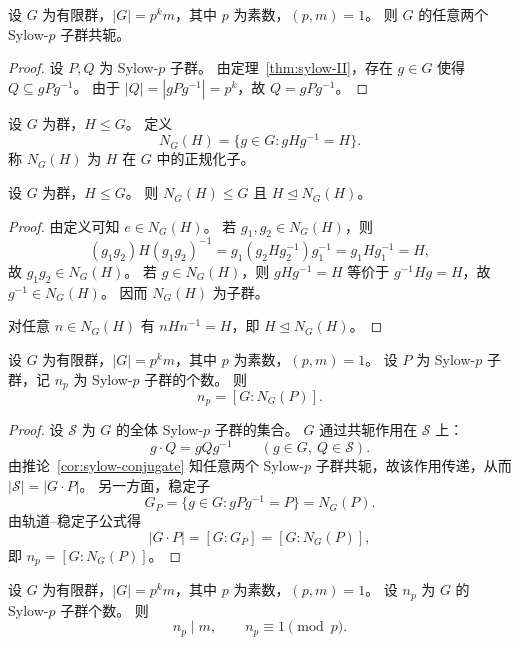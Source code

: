 \documentclass[lang=cn,a4paper,newtx]{elegantbook}
\begin{document}
\begin{corollary}\label{sylow-conjugate}
  设 $G$ 为有限群，$|G|=p^k m$，其中 $p$ 为素数，$(p,m)=1$。
  则 $G$ 的任意两个 Sylow-$p$ 子群共轭。
\end{corollary}

\begin{proof}
  设 $P,Q$ 为 Sylow-$p$ 子群。
  由定理~\ref{thm:sylow-II}，存在 $g\in G$ 使得 $Q\subseteq gPg^{-1}$。
  由于 $|Q|=|gPg^{-1}|=p^k$，故 $Q=gPg^{-1}$。
\end{proof}

\begin{definition}[正规化子]
  设 $G$ 为群，$H\le G$。
  定义
  \[
    N_G(H)=\{g\in G:gHg^{-1}=H\}.
  \]
  称 $N_G(H)$ 为 $H$ 在 $G$ 中的正规化子。
\end{definition}

\begin{proposition}
  设 $G$ 为群，$H\le G$。
  则 $N_G(H)\le G$ 且 $H\trianglelefteq N_G(H)$。
\end{proposition}

\begin{proof}
  由定义可知 $e\in N_G(H)$。
  若 $g_1,g_2\in N_G(H)$，则
  \[
    (g_1g_2)H(g_1g_2)^{-1}=g_1(g_2Hg_2^{-1})g_1^{-1}=g_1Hg_1^{-1}=H,
  \]
  故 $g_1g_2\in N_G(H)$。
  若 $g\in N_G(H)$，则 $gHg^{-1}=H$ 等价于 $g^{-1}Hg=H$，故 $g^{-1}\in N_G(H)$。
  因而 $N_G(H)$ 为子群。

  对任意 $n\in N_G(H)$ 有 $nHn^{-1}=H$，即 $H\trianglelefteq N_G(H)$。
\end{proof}

\begin{proposition}
  设 $G$ 为有限群，$|G|=p^k m$，其中 $p$ 为素数，$(p,m)=1$。
  设 $P$ 为 Sylow-$p$ 子群，记 $n_p$ 为 Sylow-$p$ 子群的个数。
  则
  \[
    n_p=[G:N_G(P)].
  \]
\end{proposition}

\begin{proof}
  设 $\mathcal{S}$ 为 $G$ 的全体 Sylow-$p$ 子群的集合。
  $G$ 通过共轭作用在 $\mathcal{S}$ 上：
  \[
    g\cdot Q=gQg^{-1}\qquad (g\in G,\ Q\in\mathcal{S}).
  \]
  由推论~\ref{cor:sylow-conjugate} 知任意两个 Sylow-$p$ 子群共轭，故该作用传递，从而 $|\mathcal{S}|=|G\cdot P|$。
  另一方面，稳定子
  \[
    G_P=\{g\in G:gPg^{-1}=P\}=N_G(P).
  \]
  由轨道--稳定子公式得
  \[
    |G\cdot P|=[G:G_P]=[G:N_G(P)],
  \]
  即 $n_p=[G:N_G(P)]$。
\end{proof}

\begin{theorem}
  设 $G$ 为有限群，$|G|=p^k m$，其中 $p$ 为素数，$(p,m)=1$。
  设 $n_p$ 为 $G$ 的 Sylow-$p$ 子群个数。
  则
  \[
    n_p\mid m,\qquad n_p\equiv 1\pmod p.
  \]
\end{theorem}
\end{document}
